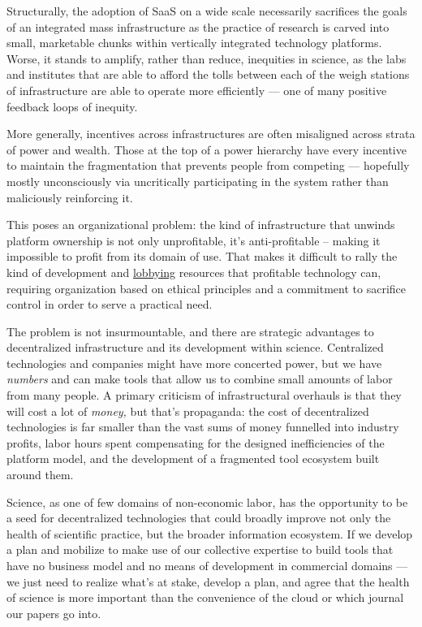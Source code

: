 \documentclass[10pt]{article}
\begin{document}
\begin{multicols}{2}
Structurally, the adoption of SaaS on a wide scale necessarily
sacrifices the goals of an integrated mass infrastructure as the
practice of research is carved into small, marketable chunks within
vertically integrated technology platforms. Worse, it stands to amplify,
rather than reduce, inequities in science, as the labs and institutes
that are able to afford the tolls between each of the weigh stations of
infrastructure are able to operate more efficiently --- one of many
positive feedback loops of inequity.

More generally, incentives across infrastructures are often misaligned
across strata of power and wealth. Those at the top of a power hierarchy
have every incentive to maintain the fragmentation that prevents people
from competing --- hopefully mostly unconsciously via uncritically
participating in the system rather than maliciously reinforcing it.

This poses an organizational problem: the kind of infrastructure that
unwinds platform ownership is not only unprofitable, it's
anti-profitable -- making it impossible to profit from its domain of
use. That makes it difficult to rally the kind of development and
\href{https://www.snsi.info/}{lobbying} resources that profitable
technology can, requiring organization based on ethical principles and a
commitment to sacrifice control in order to serve a practical need.

The problem is not insurmountable, and there are strategic advantages to
decentralized infrastructure and its development within science.
Centralized technologies and companies might have more concerted power,
but we have \emph{numbers} and can make tools that allow us to combine
small amounts of labor from many people. A primary criticism of
infrastructural overhauls is that they will cost a lot of \emph{money,}
but that's propaganda: the cost of decentralized technologies is far
smaller than the vast sums of money funnelled into industry profits,
labor hours spent compensating for the designed inefficiencies of the
platform model, and the development of a fragmented tool ecosystem built
around them.

Science, as one of few domains of non-economic labor, has the
opportunity to be a seed for decentralized technologies that could
broadly improve not only the health of scientific practice, but the
broader information ecosystem. If we develop a plan and mobilize to make
use of our collective expertise to build tools that have no business
model and no means of development in commercial domains --- we just need
to realize what's at stake, develop a plan, and agree that the health of
science is more important than the convenience of the cloud or which
journal our papers go into. 
\end{multicols}
\end{document}
